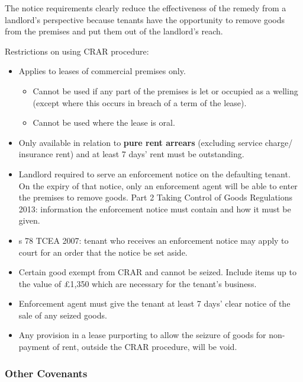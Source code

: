 \documentclass[
]{article}
\providecommand{\tightlist}{%
  \setlength{\itemsep}{0pt}\setlength{\parskip}{0pt}}
\begin{document}
The notice requirements clearly reduce the effectiveness of the remedy
from a landlord's perspective because tenants have the opportunity to
remove goods from the premises and put them out of the landlord's reach.

Restrictions on using CRAR procedure:

\begin{itemize}
\tightlist
\item
  Applies to leases of commercial premises only.

  \begin{itemize}
  \tightlist
  \item
    Cannot be used if any part of the premises is let or occupied as a
    welling (except where this occurs in breach of a term of the lease).
  \item
    Cannot be used where the lease is oral.
  \end{itemize}
\item
  Only available in relation to \textbf{pure rent arrears} (excluding
  service charge/ insurance rent) and at least 7 days' rent must be
  outstanding.
\item
  Landlord required to serve an enforcement notice on the defaulting
  tenant. On the expiry of that notice, only an enforcement agent will
  be able to enter the premises to remove goods. Part 2 Taking Control
  of Goods Regulations 2013: information the enforcement notice must
  contain and how it must be given.
\item
  s 78 TCEA 2007: tenant who receives an enforcement notice may apply to
  court for an order that the notice be set aside.
\item
  Certain good exempt from CRAR and cannot be seized. Include items up
  to the value of £1,350 which are necessary for the tenant's business.
\item
  Enforcement agent must give the tenant at least 7 days' clear notice
  of the sale of any seized goods.
\item
  Any provision in a lease purporting to allow the seizure of goods for
  non-payment of rent, outside the CRAR procedure, will be void.
\end{itemize}

\hypertarget{other-covenants}{%
\subsubsection{Other Covenants}\label{other-covenants}}
\end{document}
